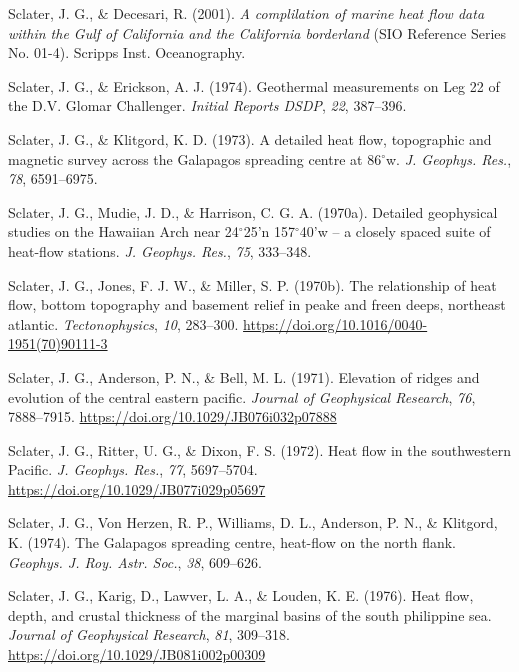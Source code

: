 \documentclass[draft,linenumbers]{agujournal2018}
\begin{document}
\leavevmode{}%
Sclater, J. G., \& Decesari, R. (2001). \emph{A complilation of marine
heat flow data within the {Gulf of California and the California
borderland}} (SIO Reference Series No. 01-4). Scripps Inst.
Oceanography.

\leavevmode{}%
Sclater, J. G., \& Erickson, A. J. (1974). Geothermal measurements on
{Leg} 22 of the {D.V. Glomar Challenger}. \emph{Initial Reports DSDP},
\emph{22}, 387--396.

\leavevmode{}%
Sclater, J. G., \& Klitgord, K. D. (1973). A detailed heat flow,
topographic and magnetic survey across the {Galapagos} spreading centre
at 86\(^\circ\)w. \emph{J. Geophys. Res.}, \emph{78}, 6591--6975.

\leavevmode{}%
Sclater, J. G., Mudie, J. D., \& Harrison, C. G. A. (1970a). Detailed
geophysical studies on the {Hawaiian Arch} near 24\(^\circ\)25'n
157\(^\circ\)40'w -- a closely spaced suite of heat-flow stations.
\emph{J. Geophys. Res.}, \emph{75}, 333--348.

\leavevmode{}%
Sclater, J. G., Jones, F. J. W., \& Miller, S. P. (1970b). The
relationship of heat flow, bottom topography and basement relief in
peake and freen deeps, northeast atlantic. \emph{Tectonophysics},
\emph{10}, 283--300. \url{https://doi.org/10.1016/0040-1951(70)90111-3}

\leavevmode{}%
Sclater, J. G., Anderson, P. N., \& Bell, M. L. (1971). Elevation of
ridges and evolution of the central eastern pacific. \emph{Journal of
Geophysical Research}, \emph{76}, 7888--7915.
\url{https://doi.org/10.1029/JB076i032p07888}

\leavevmode{}%
Sclater, J. G., Ritter, U. G., \& Dixon, F. S. (1972). Heat flow in the
southwestern {Pacific}. \emph{J. Geophys. Res.}, \emph{77}, 5697--5704.
\url{https://doi.org/10.1029/JB077i029p05697}

\leavevmode{}%
Sclater, J. G., Von Herzen, R. P., Williams, D. L., Anderson, P. N., \&
Klitgord, K. (1974). The {Galapagos} spreading centre, heat-flow on the
north flank. \emph{Geophys. J. Roy. Astr. Soc.}, \emph{38}, 609--626.

\leavevmode{}%
Sclater, J. G., Karig, D., Lawver, L. A., \& Louden, K. E. (1976). Heat
flow, depth, and crustal thickness of the marginal basins of the south
philippine sea. \emph{Journal of Geophysical Research}, \emph{81},
309--318. \url{https://doi.org/10.1029/JB081i002p00309}
\end{document}

